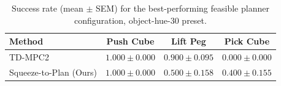 \begin{table}[t]
\centering
\begin{tabular}{lccc}
\toprule
Method & Push Cube & Lift Peg & Pick Cube \\
\midrule
TD-MPC2 & $1.000 \pm 0.000$ & $0.900 \pm 0.095$ & $0.000 \pm 0.000$ \\
Squeeze-to-Plan (Ours) & $1.000 \pm 0.000$ & $0.500 \pm 0.158$ & $0.400 \pm 0.155$ \\
\bottomrule
\end{tabular}
\caption{Success rate (mean $\pm$ SEM) for the best-performing feasible planner configuration, object-hue-30 preset.}
\label{tab:latency_vs_success_rate_object-hue-30}
\end{table}
